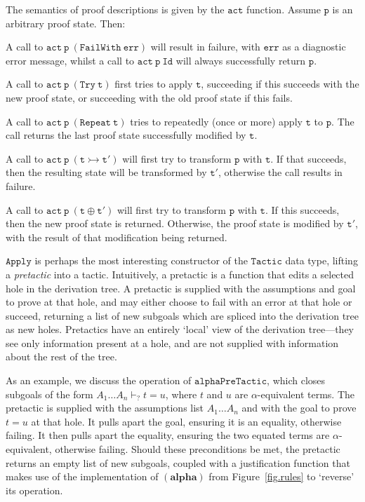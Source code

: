 \documentclass{llncs}
\newcommand{\rulefont}[1]{\ensuremath{(\mathbf{#1})}}
\begin{document}
The semantics of proof descriptions is given by the $\mathtt{act}$ function.
Assume $\mathtt{p}$ is an arbitrary proof state.
Then:
\begin{itemize*}
\item
A call to $\mathtt{act\ p\ (FailWith\ err)}$ will result in failure, with $\mathtt{err}$ as a diagnostic error message, whilst a call to $\mathtt{act\ p\ Id}$ will always successfully return $\mathtt{p}$.
\item
A call to $\mathtt{act\ p\ (Try\ t)}$ first tries to apply $\mathtt{t}$, succeeding if this succeeds with the new proof state, or succeeding with the old proof state if this fails.
\item
A call to $\mathtt{act\ p\ (Repeat\ t)}$ tries to repeatedly (once or more) apply $\mathtt{t}$ to $\mathtt{p}$.
The call returns the last proof state successfully modified by $\mathtt{t}$.
\item
A call to $\mathtt{act\ p\ (t \rightarrowtail t')}$ will first try to transform $\mathtt{p}$ with $\mathtt{t}$.
If that succeeds, then the resulting state will be transformed by $\mathtt{t'}$, otherwise the call results in failure.
\item
A call to $\mathtt{act\ p\ (t \oplus t')}$ will first try to transform $\mathtt{p}$ with $\mathtt{t}$.
If this succeeds, then the new proof state is returned.
Otherwise, the proof state is modified by $\mathtt{t'}$, with the result of that modification being returned.
\end{itemize*}
$\mathtt{Apply}$ is perhaps the most interesting constructor of the $\mathtt{Tactic}$ data type, lifting a \emph{pretactic} into a tactic.
Intuitively, a pretactic is a function that edits a selected hole in the derivation tree.
A pretactic is supplied with the assumptions and goal to prove at that hole, and may either choose to fail with an error at that hole or succeed, returning a list of new subgoals which are spliced into the derivation tree as new holes.
Pretactics have an entirely `local' view of the derivation tree---they see only information present at a hole, and are not supplied with information about the rest of the tree.

As an example, we discuss the operation of $\mathtt{alphaPreTactic}$, which closes subgoals of the form $A_1 \ldots A_n \vdash_? t = u$, where $t$ and $u$ are $\alpha$-equivalent terms.
The pretactic is supplied with the assumptions list $A_1 \ldots A_n$ and with the goal to prove $t = u$ at that hole.
It pulls apart the goal, ensuring it is an equality, otherwise failing.
It then pulls apart the equality, ensuring the two equated terms are $\alpha$-equivalent, otherwise failing.
Should these preconditions be met, the pretactic returns an empty list of new subgoals, coupled with a justification function that makes use of the implementation of \rulefont{alpha} from Figure~\ref{fig.rules} to `reverse' its operation.
\end{document}
